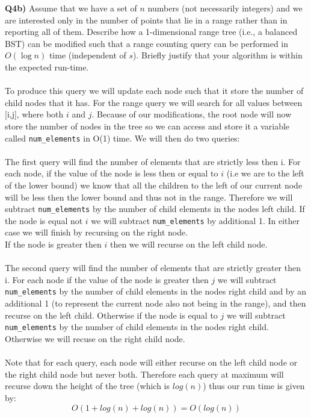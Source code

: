 \documentclass[12pt]{article}
\begin{document}
\begin{adjustwidth}{0em}{0pt}
\textbf{Q4b)} Assume that we have a set of $n$ numbers (not necessarily integers) and we are interested only
in the number of points that lie in a range rather than in reporting all of them. Describe how a 1-dimensional range tree (i.e., a balanced BST) can be modified such that a range counting query can be performed in $O(\log n)$ time (independent of $s$).  Briefly justify that your algorithm is within the expected run-time. \\\\
To produce this query we will update each node such that it store the number of child nodes that it has. For the range query we will search for all values between [i,j], where both $i$ and $j$. Because of our modifications, the root node will now store the number of nodes in the tree so we can access and store it a variable called {\tt num\_elements} in O(1) time. We will then do two queries:\\\\
The first query will find the number of elements that are strictly less then i. For each node, if the value of the node is less then or equal to $i$ (i.e we are to the left of the lower bound) we know that all the children to the left of our current node will be less then the lower bound and thus not in the range. Therefore we will subtract {\tt num\_elements} by the number of child elements in the nodes left child. If the node is equal not $i$ we will subtract {\tt num\_elements} by additional 1. In either case we will finish by recursing on the right node.\\ If the node is greater then $i$ then we will recurse on the left child node.\\\\
The second query will find the number of elements that are strictly greater then i. For each node if the value of the node is greater then $j$ we will subtract {\tt num\_elements} by the number of child elements in the nodes right child and by an additional 1 (to represent the current node also not being in the range), and then recurse on the left child. Otherwise if the node is equal to $j$ we will subtract {\tt num\_elements} by the number of child elements in the nodes right child. Otherwise we will recuse on the right child node.\\\\
Note that for each query, each node will either recurse on the left child node or the right child node but never both. Therefore each query at maximum will recurse down the height of the tree (which is $log(n)$) thus our run time is given by:
\[ O(1 + log(n) + log(n)) = O(log(n)) \]
\end{adjustwidth} 
\end{document}
